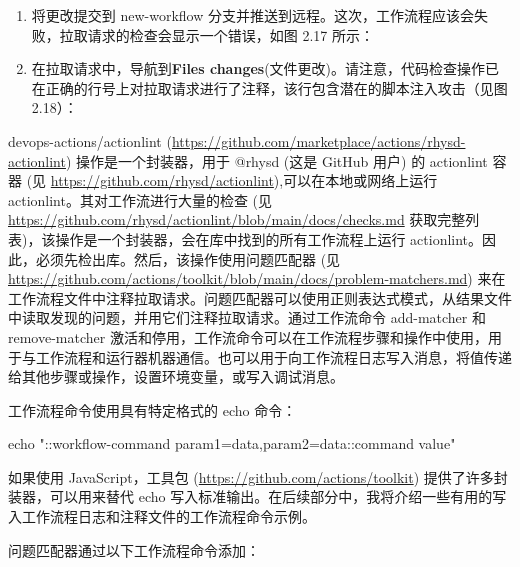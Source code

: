 \begin{enumerate}

\item 
将更改提交到 new-workflow 分支并推送到远程。这次，工作流程应该会失败，拉取请求的检查会显示一个错误，如图 2.17 所示：


\item 
在拉取请求中，导航到\textbf{Files changes}(文件更改)。请注意，代码检查操作已在正确的行号上对拉取请求进行了注释，该行包含潜在的脚本注入攻击（见图 2.18）：

\end{enumerate}


devops-actions/actionlint (\url{https://github.com/marketplace/actions/rhysd-actionlint}) 操作是一个封装器，用于 @rhysd (这是 GitHub 用户) 的 actionlint 容器 (见 \url{https://github.com/rhysd/actionlint}),可以在本地或网络上运行 actionlint。其对工作流进行大量的检查 (见 \url{https://github.com/rhysd/actionlint/blob/main/docs/checks.md} 获取完整列表)，该操作是一个封装器，会在库中找到的所有工作流程上运行 actionlint。因此，必须先检出库。然后，该操作使用问题匹配器 (见 \url{https://github.com/actions/toolkit/blob/main/docs/problem-matchers.md}) 来在工作流程文件中注释拉取请求。问题匹配器可以使用正则表达式模式，从结果文件中读取发现的问题，并用它们注释拉取请求。通过工作流命令 add-matcher 和 remove-matcher 激活和停用，工作流命令可以在工作流程步骤和操作中使用，用于与工作流程和运行器机器通信。也可以用于向工作流程日志写入消息，将值传递给其他步骤或操作，设置环境变量，或写入调试消息。

工作流程命令使用具有特定格式的 echo 命令：

\begin{shell}
  echo "::workflow-command param1={data},param2={data}::{command value}"
\end{shell}

如果使用 JavaScript，工具包 (\url{https://github.com/actions/toolkit}) 提供了许多封装器，可以用来替代 echo 写入标准输出。在后续部分中，我将介绍一些有用的写入工作流程日志和注释文件的工作流程命令示例。

问题匹配器通过以下工作流程命令添加：

